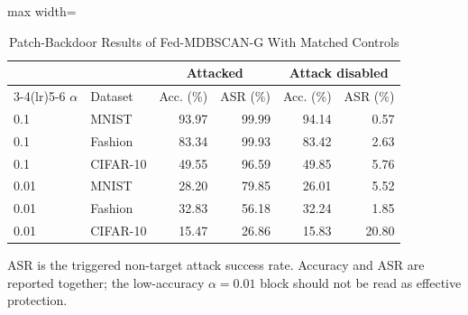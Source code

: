 \begin{table}[!t]
\centering\footnotesize
\setlength{\tabcolsep}{4pt}
\caption{Patch-Backdoor Results of Fed-MDBSCAN-G With Matched Controls}\label{tab:backdoor}
\begin{adjustbox}{max width=\columnwidth}
\begin{tabular}{llrrrr}
\toprule
& & \multicolumn{2}{c}{Attacked} & \multicolumn{2}{c}{Attack disabled} \\
\cmidrule(lr){3-4}\cmidrule(lr){5-6}
$\alpha$ & Dataset & Acc. (\%) & ASR (\%) & Acc. (\%) & ASR (\%) \\
\midrule
0.1 & MNIST & 93.97 & 99.99 & 94.14 & 0.57 \\
0.1 & Fashion & 83.34 & 99.93 & 83.42 & 2.63 \\
0.1 & CIFAR-10 & 49.55 & 96.59 & 49.85 & 5.76 \\
0.01 & MNIST & 28.20 & 79.85 & 26.01 & 5.52 \\
0.01 & Fashion & 32.83 & 56.18 & 32.24 & 1.85 \\
0.01 & CIFAR-10 & 15.47 & 26.86 & 15.83 & 20.80 \\
\bottomrule
\end{tabular}
\end{adjustbox}

\par\vspace{3pt}\parbox{\linewidth}{\footnotesize ASR is the triggered non-target attack success rate. Accuracy and ASR are reported together; the low-accuracy $\alpha=0.01$ block should not be read as effective protection.}
\end{table}
